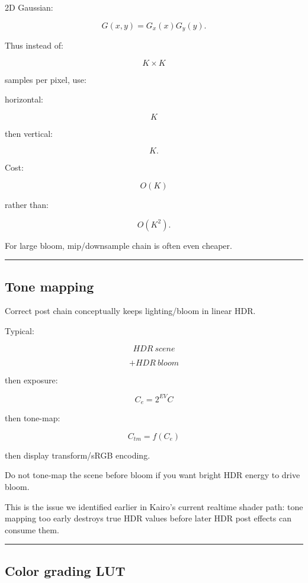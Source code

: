 2D Gaussian:

\[
G(x,y)
=
G_x(x)G_y(y).
\]

Thus instead of:

\[
K\times K
\]

samples per pixel, use:

horizontal:

\[
K
\]

then vertical:

\[
K.
\]

Cost:

\[
O(K)
\]

rather than:

\[
O(K^2).
\]

For large bloom, mip/downsample chain is often even cheaper.

\begin{center}\rule{0.5\linewidth}{0.5pt}\end{center}

\subsection{Tone mapping}\label{04-visual-computing-ii-ch040-tone-mapping}

Correct post chain conceptually keeps lighting/bloom in linear HDR.

Typical:

\[
HDR\ scene
\]

\[
+
HDR\ bloom
\]

then exposure:

\[
C_e=
2^{EV}C
\]

then tone-map:

\[
C_{tm}=f(C_e)
\]

then display transform/sRGB encoding.

Do not tone-map the scene before bloom if you want bright HDR energy to drive bloom.

This is the issue we identified earlier in Kairo's current realtime shader path: tone mapping too early destroys true HDR values before later HDR post effects can consume them.

\begin{center}\rule{0.5\linewidth}{0.5pt}\end{center}

\subsection{Color grading LUT}\label{04-visual-computing-ii-ch040-color-grading-lut}

